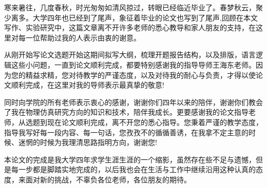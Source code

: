 \begin{acknowledgements} 
	
	寒来暑往，几度春秋，时光匆匆如清风掠过，转眼已经临近毕业了。春梦秋云，聚少离多。大学四年也已经到了尾声，象征着毕业的论文也写到了尾声,回顾在本文写作、实验研究中，这篇文章离不开许多老师的悉心教导和家人朋友的支持，在这里对每一位帮助过我的人表示由衷的谢意。
	
	从刚开始写论文选题开始这期间拟写大纲，梳理开题报告结构，以及排版，语言逻辑这些小问题，一直到论文顺利完成，都要特别感谢我的指导导师王海东老师。因为您的精益求精，您对待教学的严谨态度，以及对待我的耐心与负责，才得以使论文顺利完成，在这里对我的导师表示最真挚的敬意!
	
	同时向学院的所有老师表示衷心的感谢，谢谢你们四年以来的陪伴，谢谢你们教会了我在物理仿真研究方向的知识和技术，陪伴我成长。更要感谢我的论文指导老师，从选题到现在论文顺利完成，离不开您的悉心指导。您秉着严谨的教学态度，指导我写好每一段内容、每一句话，您孜孜不的循循善诱，在我拿不定主意的时候、迷惘的时候为我理清思路指明方向，谢谢您!
	
	本论文的完成是我大学四年求学生涯生涯的一个缩影，虽然存在些不足与遗憾，但是每一步都是脚踏实地完成的，以后我也会在生活与工作中继续沿用这种认真的态度，来面对新的挑战，不辜负各位老师，各位朋友的期待。
	
\end{acknowledgements}
